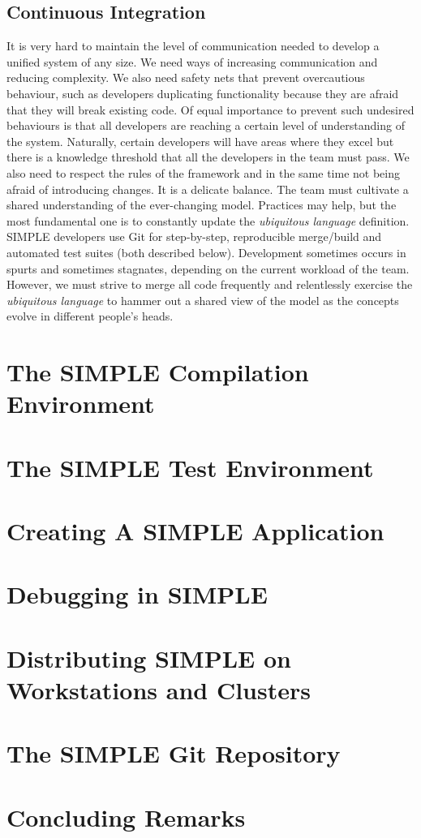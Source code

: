 \documentclass[a4paper,11pt]{article}
\begin{document}
\subsection{Continuous Integration}
It is very hard to maintain the level of communication needed to develop a unified system of any size. We need ways of increasing communication and reducing complexity. We also need safety nets that prevent overcautious behaviour, such as developers duplicating functionality because they are afraid that they will break existing code. Of equal importance to prevent such undesired behaviours is that all developers are reaching a certain level of understanding of the system. Naturally, certain developers will have areas where they excel but there is a knowledge threshold that all the developers in the team must pass. We also need to respect the rules of the framework and in the same time not being afraid of introducing changes. It is a delicate balance. The team must cultivate a shared understanding of the ever-changing model. Practices may help, but the most fundamental one is to constantly update the \textit{ubiquitous language} definition. SIMPLE developers use Git for step-by-step, reproducible merge/build and automated test suites (both described below). Development sometimes occurs in spurts and sometimes stagnates, depending on the current workload of the team. However, we must strive to merge all code frequently and relentlessly exercise the  \textit{ubiquitous language} to hammer out a shared view of the model as the concepts evolve in different people's heads.

\section{The SIMPLE Compilation Environment}

\section{The SIMPLE Test Environment}

\section{Creating A SIMPLE Application}

\section{Debugging in SIMPLE}

\section{Distributing SIMPLE on Workstations and Clusters}

\section{The SIMPLE Git Repository}

\section{Concluding Remarks}
\end{document}
